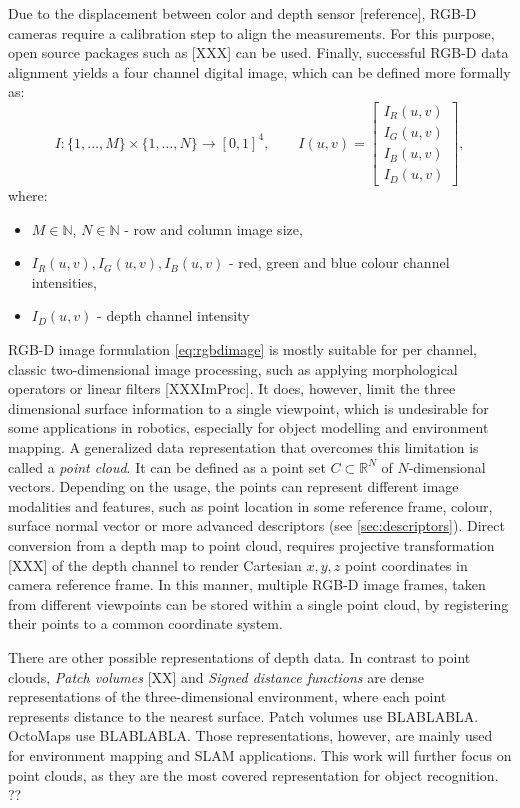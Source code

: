 Due to the displacement between color and depth sensor [reference], RGB-D cameras require a calibration step to align the measurements. For this purpose, open source packages such as [XXX] can be used. Finally, successful RGB-D data alignment yields a four channel digital image, which can be defined more formally as:
\begin{equation}
\label{eq:rgbdimage}
I: \{1,\dots,M\} \times \{1,\dots,N\} \rightarrow [0,1]^4,\qquad I(u,v) =  \begin{bmatrix} I_R(u,v) \\ I_G(u,v) \\ I_B(u,v) \\ I_D(u,v) \end{bmatrix},
\end{equation}
where:
\begin{itemize}
\item $M \in \mathbb{N}$, $N \in \mathbb{N}$ - row and column image size,
\item $I_R(u,v), I_G(u,v), I_B(u,v)$ - red, green and blue colour channel intensities,
\item $I_D(u,v)$ - depth channel intensity
\end{itemize}

RGB-D image formulation \ref{eq:rgbdimage} is mostly suitable for per channel, classic two-dimensional image processing, such as applying morphological operators or linear filters [XXXImProc]. It does, however, limit the three dimensional surface information to a single viewpoint, which is undesirable for some applications in robotics, especially for object modelling and environment mapping. A generalized data representation that overcomes this limitation is called a \textit{point cloud}. It can be defined as a point set $C \subset \mathbb{R}^N$ of $N$-dimensional vectors. Depending on the usage, the points can represent different image modalities and features, such as point location in some reference frame, colour, surface normal vector or more advanced descriptors (see \ref{sec:descriptors}). Direct conversion from a depth map to point cloud, requires projective transformation [XXX] of the depth channel to render Cartesian $x,y,z$ point coordinates in camera reference frame. In this manner, multiple RGB-D image frames, taken from different viewpoints can be stored within a single point cloud, by registering their points to a common coordinate system.

There are other possible representations of depth data. In contrast to point clouds, \textit{Patch volumes} [XX] and \textit{Signed distance functions} are dense representations of the three-dimensional environment, where each point represents distance to the nearest surface. Patch volumes use BLABLABLA. OctoMaps use BLABLABLA. Those representations, however, are mainly used for environment mapping and SLAM applications. This work will further focus on point clouds, as they are the most covered representation for object recognition. ??


